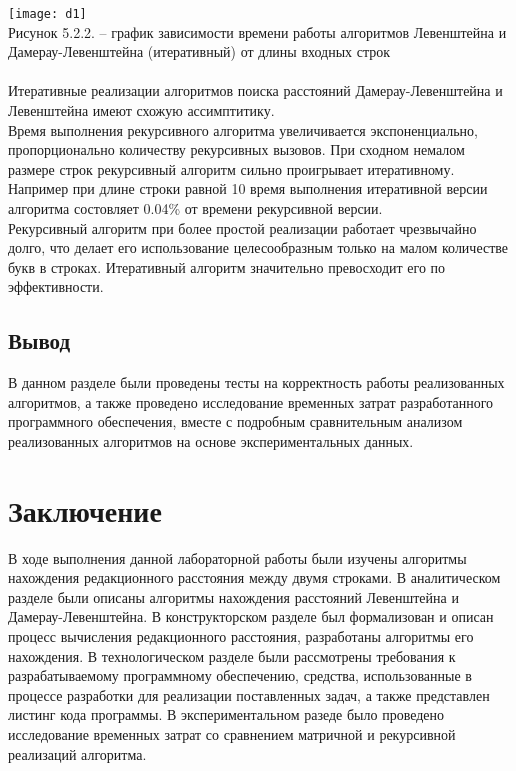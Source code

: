 \documentclass[a4paper, 14pt]{article}
\begin{document}
\texttt{[image: d1]} \\

\small Рисунок 5.2.2. – график зависимости времени работы алгоритмов Левенштейна и Дамерау-Левенштейна (итеративный) от длины входных строк \normalsize \\\\
	
		Итеративные реализации алгоритмов поиска расстояний Дамерау-Левенштейна и Левенштейна имеют схожую ассимптитику. \\
	
	Время выполнения рекурсивного алгоритма увеличивается экспоненциально, пропорционально количеству рекурсивных вызовов. При сходном немалом размере строк рекурсивный алгоритм сильно проигрывает итеративному. Например при длине строки равной 10 время выполнения итеративной версии алгоритма состовляет 0.04\% от времени рекурсивной версии. \\
	
	Рекурсивный алгоритм при более простой реализации работает чрезвычайно долго, что делает его использование целесообразным только на малом количестве букв в строках. Итеративный алгоритм значительно превосходит его по эффективности.
	
	\subsection{Вывод}
	
	В данном разделе были проведены тесты на корректность работы реализованных алгоритмов, а также проведено исследование временных затрат разработанного программного обеспечения, вместе с подробным сравнительным анализом реализованных алгоритмов на основе экспериментальных данных.
	

	\newpage
	\section*{Заключение}
	
	В ходе выполнения данной лабораторной работы были изучены алгоритмы нахождения редакционного расстояния между двумя строками. В аналитическом разделе были описаны алгоритмы нахождения расстояний Левенштейна и Дамерау-Левенштейна. В конструкторском разделе был формализован и описан процесс вычисления редакционного расстояния, разработаны алгоритмы его нахождения. В технологическом разделе были рассмотрены требования к разрабатываемому программному обеспечению, средства, использованные в процессе разработки для реализации поставленных задач, а также представлен листинг кода программы. В экспериментальном разеде было проведено исследование временных затрат со сравнением матричной и рекурсивной реализаций алгоритма.
	
\end{document}
